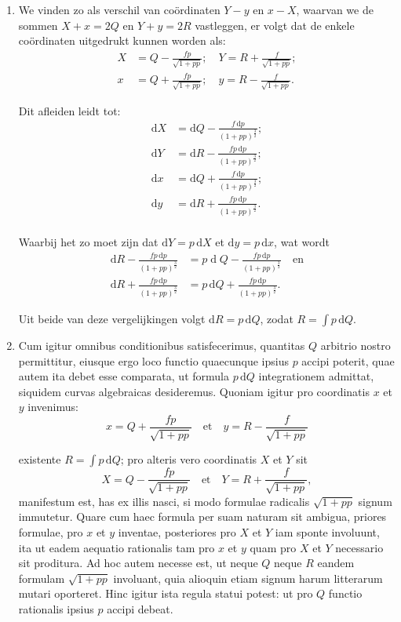 \documentclass[10pt,a4paper]{article}
\newcommand{\switchenum}{\setcounter{enumi}{\arabic{enumi}-1}\switchcolumn}
\def\D{\mathrm{d}}
\begin{document}
\begin{paracol}{2}
\begin{enumerate}[topsep=1px]
		\switchenum
		\item We vinden zo als verschil van coördinaten $Y-y$ en $x-X$, waarvan we de sommen $X+x=2Q$ en $Y+y=2R$ vastleggen, er volgt dat de enkele coördinaten uitgedrukt kunnen worden als:
		\begin{align*}
			X &= Q - \frac{fp}{\sqrt{1+pp}}; \quad Y = R + \frac{f}{\sqrt{1+pp}};\\
			x &= Q+\frac{fp}{\sqrt{1+pp}}; \quad y= R- \frac{f}{\sqrt{1+pp}}.
		\end{align*}
		\par Dit afleiden leidt tot:
		\begin{align*}
			\D X &= \D Q - \frac{f\,\D p}{(1+pp)^\frac{3}{2}};\\
			\D Y &= \D R-\frac{fp\,\D p}{(1+pp)^\frac{3}{2}};\\
			\D x &= \D Q + \frac{f\,\D p}{(1+pp)^\frac{3}{2}};\\
			\D y &= \D R + \frac{fp\,\D p}{(1+pp)^\frac{3}{2}}.\\
		\end{align*}
		\par Waarbij het zo moet zijn dat $\D Y=p\,\D X$ et $\D y=p\,\D x$, wat wordt
		\begin{align*}
			\D R - \frac{fp\,\D p}{(1+pp)^\frac{3}{2}} &= p\operatorname{d}Q - \frac{fp\, \D p}{(1+pp)^\frac{3}{2}} \quad \text{en}\\
			\D R + \frac{fp\,\D p}{(1+pp)^\frac{3}{2}} &= p\,\D Q + \frac{fp\,\D p}{(1+pp)^\frac{3}{2}}.
		\end{align*}
		\par Uit beide van deze vergelijkingen volgt $\D R = p \, \D Q$, zodat $R= \int p \,\D Q$.
		\switchcolumn*
		
		\item Cum igitur omnibus conditionibus satisfecerimus, quantitas $Q$ arbitrio nostro permittitur, eiusque ergo loco functio quaecunque ipsius $p$ accipi poterit, quae autem ita debet esse comparata, ut formula $p\,\D Q$ integrationem admittat, siquidem curvas algebraicas desideremus. Quoniam igitur pro coordinatis $x$ et $y$ invenimus:
		\[
			x = Q + \frac{fp}{\sqrt{1+pp}} \quad\text{et}\quad y = R - \frac{f}{\sqrt{1+pp}}
		\]
		\par existente $R = \int p \,\D Q$; pro alteris vero coordinatis $X$ et $Y$ sit
		\[
			X = Q- \frac{fp}{\sqrt{1+pp}} \quad \text{et} \quad Y = R + \frac{f}{\sqrt{1+pp}},
		\]
		manifestum est, has ex illis nasci, si modo formulae radicalis $\sqrt{1+pp}$ signum immutetur. Quare cum haec formula per suam naturam sit ambigua, priores formulae, pro $x$ et $y$ inventae, posteriores pro $X$ et $Y$ iam sponte involuunt, ita ut eadem aequatio rationalis tam pro $x$ et $y$ quam pro $X$ et $Y$ necessario sit proditura. Ad hoc autem necesse est, ut neque $Q$ neque $R$ eandem formulam $\sqrt{1+pp}$ involuant, quia alioquin etiam signum harum litterarum mutari oporteret. Hinc igitur ista regula statui potest: ut pro $Q$ functio rationalis ipsius $p$ accipi debeat.
		

\end{enumerate}
\end{paracol}
\end{document}
